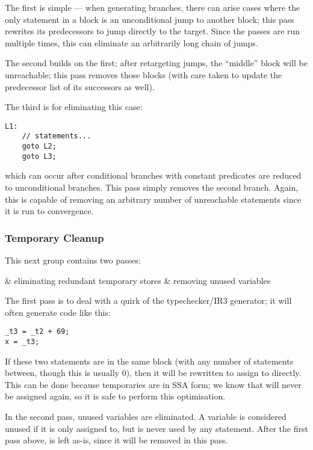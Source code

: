 \documentclass[12pt]{article}
\begin{document}
The first is simple --- when generating branches, there can arise cases where the only statement in a block is an unconditional jump
to another block; this pass rewrites its predecessors to jump directly to the target. Since the passes are run multiple times, this
can eliminate an arbitrarily long chain of jumps.

The second builds on the first; after retargeting jumps, the \enquote{middle} block will be unreachable; this pass removes those
blocks (with care taken to update the predecessor list of its successors as well).

The third is for eliminating this case:

\begin{verbatim}
L1:
	// statements...
	goto L2;
	goto L3;
\end{verbatim}

which can occur after conditional branches with constant predicates are reduced to unconditional branches. This pass simply removes
the second branch. Again, this is capable of removing an arbitrary number of unreachable statements since it is run to convergence.



\subsubsection{Temporary Cleanup}

This next group contains two passes:

\begin{romanlist2}
&   eliminating redundant temporary stores
&   removing unused variables
\end{romanlist2}

The first pass is to deal with a quirk of the typechecker/IR3 generator; it will often generate code like this:

\begin{verbatim}
_t3 = _t2 + 69;
x = _t3;
\end{verbatim}

If these two statements are in the same block (with any number of statements between, though this is usually 0), then
it will be rewritten to assign to  directly. This can be done because temporaries are in SSA form; we know that
 will never be assigned again, so it is safe to perform this optimisation.

In the second pass, unused variables are eliminated. A variable is considered unused if it is only assigned to, but is never
used by any statement. After the first pass above,  is left as-is, since it will be removed in this pass.
\end{document}
